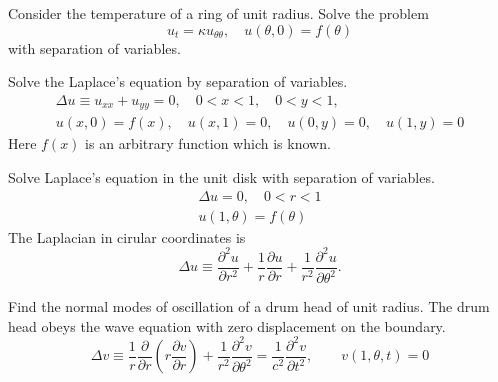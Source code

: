 {\begin{Exercise}
\end{Exercise}



\begin{Exercise}
  \label{exercise Heat equation on a ring}
  Consider the temperature of a ring of unit radius.  Solve the problem
  \[
  u_t = \kappa u_{\theta\theta}, \quad u(\theta,0) = f(\theta)
  \]
  with separation of variables.

\end{Exercise}




\begin{Exercise}
  \label{exercise laplace separation 0101}
  Solve the Laplace's equation by separation of variables.
  \begin{gather*}
    \Delta u \equiv u_{x x} + u_{y y} = 0, \quad 0 < x < 1, \quad 0 < y < 1, \\
    u(x,0) = f(x), \quad u(x,1) = 0, \quad
    u(0,y) = 0, \quad u(1,y) = 0
  \end{gather*}
  Here $f(x)$ is an arbitrary function which is known.

\end{Exercise}






\begin{Exercise}
  \label{exercise laplace unit disk}
  Solve Laplace's equation in the unit disk with separation of variables.
  \begin{gather*}
    \Delta u = 0, \quad 0 < r < 1
    \\
    u(1,\theta) = f(\theta)
  \end{gather*}
  The Laplacian in cirular coordinates is
  \[
  \Delta u \equiv \frac{\partial^2 u}{\partial r^2} + \frac{1}{r} \frac{\partial u}{\partial r} 
  + \frac{1}{r^2} \frac{\partial^2 u}{\partial \theta^2}.
  \]

\end{Exercise}







\begin{Exercise}
  \label{exercise normal modes drum unit radius}
  Find the normal modes of oscillation of a drum head of unit radius.  
  The drum head obeys the wave equation with zero displacement on the boundary.
  \[
  \Delta v \equiv \frac{1}{r} \frac{\partial}{\partial r} \left( r \frac{\partial v}{\partial r} \right)
  + \frac{1}{r^2} \frac{\partial^2 v}{\partial \theta^2} = \frac{1}{c^2} \frac{\partial^2 v}{\partial t^2}, 
  \qquad v(1,\theta,t) = 0
  \]


\end{Exercise}}
